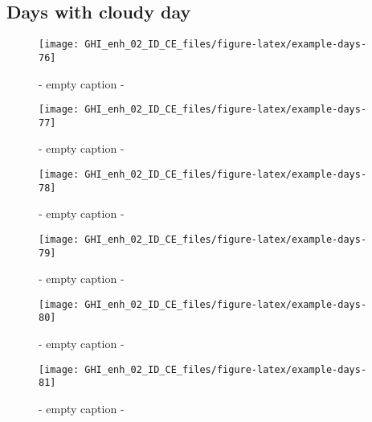 \documentclass[
  10pt,
  a4paper,oneside]{article}
\begin{document}
\FloatBarrier

\hypertarget{days-with-cloudy-day}{%
\subsection{Days with cloudy day}\label{days-with-cloudy-day}}

\begin{figure}[H]

{\centering \texttt{[image: GHI\_enh\_02\_ID\_CE\_files/figure-latex/example-days-76]} 

}

\caption{ - empty caption - }\label{fig:example-days-76}
\end{figure}

\begin{figure}[H]

{\centering \texttt{[image: GHI\_enh\_02\_ID\_CE\_files/figure-latex/example-days-77]} 

}

\caption{ - empty caption - }\label{fig:example-days-77}
\end{figure}

\begin{figure}[H]

{\centering \texttt{[image: GHI\_enh\_02\_ID\_CE\_files/figure-latex/example-days-78]} 

}

\caption{ - empty caption - }\label{fig:example-days-78}
\end{figure}

\begin{figure}[H]

{\centering \texttt{[image: GHI\_enh\_02\_ID\_CE\_files/figure-latex/example-days-79]} 

}

\caption{ - empty caption - }\label{fig:example-days-79}
\end{figure}

\begin{figure}[H]

{\centering \texttt{[image: GHI\_enh\_02\_ID\_CE\_files/figure-latex/example-days-80]} 

}

\caption{ - empty caption - }\label{fig:example-days-80}
\end{figure}

\begin{figure}[H]

{\centering \texttt{[image: GHI\_enh\_02\_ID\_CE\_files/figure-latex/example-days-81]} 

}

\caption{ - empty caption - }\label{fig:example-days-81}
\end{figure}
\end{document}
